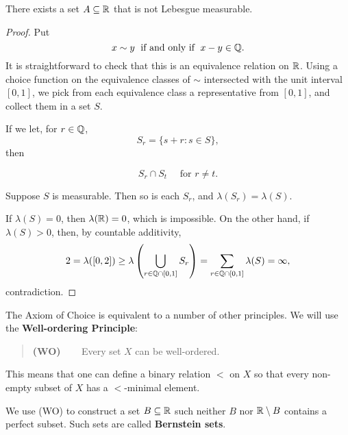 \begin{theorem}[Vitali]\label{thm-vitali-nonmeasurable}There exists a set $A \subseteq \mathbb{R}$ that is not Lebesgue measurable.

\end{theorem}\begin{proof}Put
\begin{equation*}
x \sim y \; \text{ if and only if }\;  x-y \in \mathbb{Q}.
\end{equation*}
It is straightforward to check that this is an equivalence relation on $\mathbb{R}$.
Using a choice function on the equivalence classes of $\sim$ intersected with the unit interval $[0,1]$, we pick from each equivalence class a representative from $[0,1]$, and collect them in a set $S$.

If we let, for $r \in \mathbb{Q}$,
\begin{equation*}
S_r = \{s+r \colon s \in S \},
\end{equation*}
then

\begin{equation}
S_r \cap S_t \quad \text{ for $r \neq t$}.
\end{equation}

Suppose $S$ is measurable. Then so is each $S_r$, and $\lambda(S_r) = \lambda(S)$.

If $\lambda(S) = 0$, then $\lambda(\mathbb{R}) = 0$, which is impossible.
On the other hand, if $\lambda(S) > 0$, then, by countable additivity,
\begin{equation*}
2 = \lambda([0,2]) \geq \lambda\left(\bigcup_{r\in \mathbb{Q}\cap[0,1]} S_r\right) = \sum_{r\in \mathbb{Q}\cap[0,1]} \lambda(S) = \infty,
\end{equation*}
contradiction.

\end{proof}The Axiom of Choice is equivalent to a number of other principles. We will use the \textbf{Well-ordering Principle}:

\begin{quote}
\textbf{(WO)} ~~~ Every set $X$ can be well-ordered.
\end{quote}

This means that one can define a binary relation $<$ on $X$ so that every non-empty subset of $X$ has a $<$-minimal element.

We use (WO) to construct a set $B\subseteq \mathbb{R}$ such neither $B$ nor $\mathbb{R}\setminus B$ contains a perfect subset. Such sets are called \textbf{Bernstein sets}.


